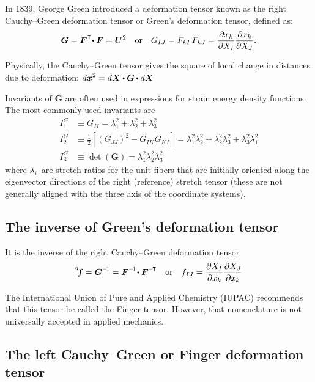 \begin{otherlanguage}{russian}
{In 1839, George Green introduced a deformation tensor known as the right Cauchy\hbox{--}Green deformation tensor or Green’s deformation tensor, defined as:
\[ \displaystyle \bm{G} = \bm{F}^{\hspace{.1ex}\T} \!\dotp \bm{F} = \bm{U}^{2}
\quad {\text{or}} \quad
G_{IJ} = F_{kI}\,F_{kJ} = {\frac{\partial x_{k}}{\partial X_{I}}}{\frac{\partial x_{k}}{\partial X_{J}}}. \]

Physically, the Cauchy\hbox{--}Green tensor gives the square of local change in distances due to deformation: ${\displaystyle d\bm{x} ^{2}=d\bm{X} \dotp \bm{G} \dotp d\bm{X} \,\!}$

Invariants of ${\bm{G}}$ are often used in expressions for strain energy density functions. The most commonly used invariants are
\[{\displaystyle {\begin{aligned}I_{1}^{G} & \equiv G_{II}=\lambda_{1}^{2}+\lambda_{2}^{2}+\lambda_{3}^{2}\\
I_{2}^{G} & \equiv {\tfrac {1}{2}}\left[(G_{JJ})^{2} - G_{IK} G_{KI}\right] = \lambda_{1}^{2}\lambda_{2}^{2}+\lambda_{2}^{2}\lambda_{3}^{2}+\lambda_{3}^{2}\lambda_{1}^{2}\\
I_{3}^{G} & \equiv \det(\bm{G} )=\lambda_{1}^{2}\lambda_{2}^{2}\lambda_{3}^{2}\end{aligned}}}\]
where $\lambda_{i}\,\!$ are stretch ratios for the unit fibers that are initially oriented along the eigenvector directions of the right (reference) stretch tensor (these are not generally aligned with the three axis of the coordinate systems).

\subsection*{The inverse of Green’s deformation tensor}

It is the inverse of the right Cauchy\hbox{--}Green deformation tensor
\[ \displaystyle ^2\hspace{-0.4ex}\bm{f} = \bm{G}^{\expminusone} = \bm{F}^{\expminusone} \! \dotp \bm{F}^{\expminusT}
\quad {\text{or}} \quad
f_{IJ}={\frac{\partial X_{I}}{\partial x_{k}}}{\frac{\partial X_{J}}{\partial x_{k}}} \]

The International Union of Pure and Applied Chemistry (IUPAC) recommends that this tensor be called the Finger tensor. However, that nomenclature is not universally accepted in applied mechanics.

\subsection*{The left Cauchy\hbox{--}Green or Finger deformation tensor}

}
\end{otherlanguage}
